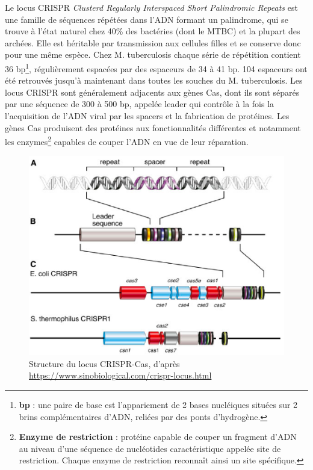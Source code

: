 \documentclass[twoside,a4paper,11pt,frenchb,openany]{report}
\begin{document}
Le locus CRISPR \textit{Clusterd Regularly Interspaced Short Palindromic Repeats} est une famille de séquences répétées dans l'ADN formant un palindrome, qui se trouve à l'état naturel chez 40\% des bactéries (dont le MTBC) et la plupart des archées. Elle est héritable par transmission aux cellules filles et se conserve donc pour une même espèce. Chez M. tuberculosis chaque série de répétition contient 36 bp\footnote{\textbf{bp} : une paire de base est l'appariement de 2 bases nucléiques situées sur 2 brins complémentaires d'ADN, reliées par des ponts d'hydrogène.}, régulièrement espacées par des espaceurs de 34 à 41 bp. 104 espaceurs ont été retrouvés jusqu'à maintenant dans toutes les souches du M. tuberculosis. Les locus CRISPR sont généralement adjacents aux gènes Cas, dont ils sont séparés par une séquence de 300 à 500 bp, appelée leader qui contrôle à la fois la l'acquisition de l'ADN viral par les spacers et la fabrication de protéines. Les gènes Cas produisent des protéines aux fonctionnalités différentes et notamment les enzymes\footnote{\textbf{Enzyme de restriction} : protéine capable de couper un fragment d'ADN au niveau d'une séquence de nucléotides caractéristique appelée site de restriction. Chaque enzyme de restriction reconnaît ainsi un site spécifique.} capables de couper l'ADN en vue de leur réparation.

\begin{figure}[h!]
\centering
\includegraphics[scale=0.6]{crispr.png}
\caption{Structure du locus CRISPR-Cas, d'après\\ \url{https://www.sinobiological.com/crispr-locus.html}}
\end{figure}
\end{document}
